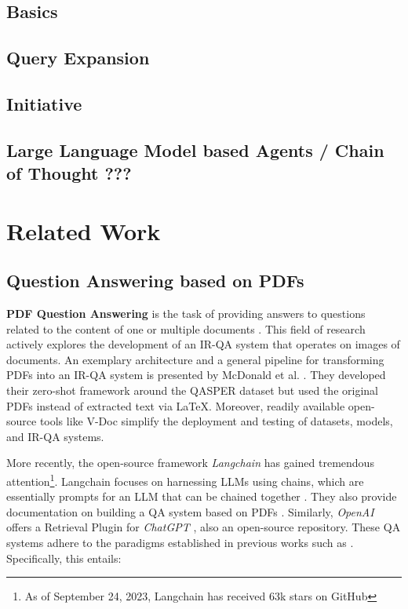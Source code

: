 \subsection{Basics}
\label{subsec:cqa_basics}

\subsection{Query Expansion}
\label{subsec:cqa_query_expansion}

\subsection{Initiative}
\label{subsec:cqa_initiative}

\subsection{Large Language Model based Agents / Chain of Thought ???}
\label{subsec:cqa_llm_agents}

\section{Related Work}
\label{sec:related_work}

\subsection{Question Answering based on PDFs}
\label{subsec:related_work_dbqa}

\textbf{PDF Question Answering} is the task of providing answers to questions related to the content of one or multiple documents \cite{mathew_document_2021}. This field of research actively explores the development of an IR-QA system that operates on images of documents. An exemplary architecture and a general pipeline for transforming PDFs into an IR-QA system is presented by McDonald et al. \cite{mcdonald_detect_2022}. They developed their zero-shot framework around the QASPER dataset but used the original PDFs instead of extracted text via LaTeX. Moreover, readily available open-source tools like V-Doc \cite{ding_v-doc_2022} simplify the deployment and testing of datasets, models, and IR-QA systems.

More recently, the open-source framework \textit{Langchain} has gained tremendous attention\footnote{As of September 24, 2023, Langchain has received 63k stars on GitHub}. Langchain focuses on harnessing LLMs using chains, which are essentially prompts for an LLM that can be chained together \cite{noauthor_langchain-ailangchain_nodate}. They also provide documentation on building a QA system based on PDFs \cite{noauthor_question_nodate}. Similarly, \textit{OpenAI} offers a Retrieval Plugin for \textit{ChatGPT} \cite{noauthor_chatgpt_2023}, also an open-source repository. These QA systems adhere to the paradigms established in previous works such as \cite{karpukhin_dense_2020,ni_large_2021,neelakantan_text_2022,lewis_retrieval-augmented_2021}. Specifically, this entails:

